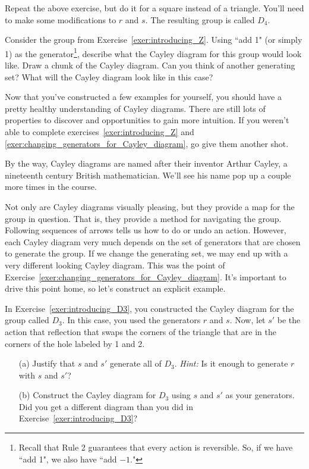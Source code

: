 \begin{exercise}\label{exer:introducing_D4}
Repeat the above exercise, but do it for a square instead of a triangle.  You'll need to make some modifications to $r$ and $s$.  The resulting group is called $D_4$.
\end{exercise}

\begin{exercise}
Consider the group from Exercise~\ref{exer:introducing_Z}.  Using ``add 1" (or simply 1) as the generator\footnote{Recall that Rule 2 guarantees that every action is reversible.  So, if we have ``add 1", we also have ``add $-1$."}, describe what the Cayley diagram for this group would look like.  Draw a chunk of the Cayley diagram.  Can you think of another generating set?  What will the Cayley diagram look like in this case?
\end{exercise}

Now that you've constructed a few examples for yourself, you should have a pretty healthy understanding of Cayley diagrams.  There are still lots of properties to discover and opportunities to gain more intuition.  If you weren't able to complete exercises~\ref{exer:introducing_Z} and \ref{exer:changing_generators_for_Cayley_diagram}, go give them another shot.

By the way, Cayley diagrams are named after their inventor Arthur Cayley, a nineteenth century British mathematician.  We'll see his name pop up a couple more times in the course.  

Not only are Cayley diagrams visually pleasing, but they provide a map for the group in question.  That is, they provide a method for navigating the group.  Following sequences of arrows tells us how to do or undo an action.  However, each Cayley diagram very much depends on the set of generators that are chosen to generate the group.  If we change the generating set, we may end up with a very different looking Cayley diagram.  This was the point of Exercise~\ref{exer:changing_generators_for_Cayley_diagram}.  It's important to drive this point home, so let's construct an explicit example.

\begin{exercise}\label{exer:alternate_D3}
In Exercise~\ref{exer:introducing_D3}, you constructed the Cayley diagram for the group called $D_3$.  In this case, you used the generators $r$ and $s$.  Now, let $s'$ be the action that reflection that swaps the corners of the triangle that are in the corners of the hole labeled by 1 and 2.  
\begin{enumerate}
\item[(a)] Justify that $s$ and $s'$ generate all of $D_3$.  \emph{Hint:} Is it enough to generate $r$ with $s$ and $s'$?
\item[(b)] Construct the Cayley diagram for $D_3$ using $s$ and $s'$ as your generators.  Did you get a different diagram than you did in Exercise~\ref{exer:introducing_D3}?
\end{enumerate}
\end{exercise}


